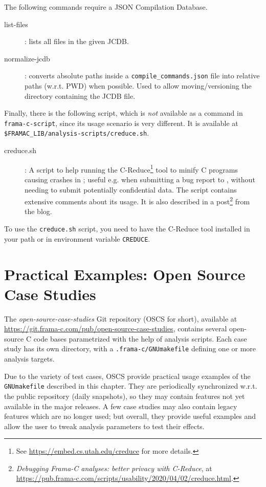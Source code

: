 The following commands require a JSON Compilation Database.

\begin{description}
\item[list-files]: lists all files in the given JCDB.
\item[normalize-jcdb]: converts absolute paths inside a
  \texttt{compile\_commands.json} file into relative paths (w.r.t. PWD)
  when possible. Used to allow moving/versioning the directory containing
  the JCDB file.
\end{description}

Finally, there is the following script, which is {\em not} available as a
command in \texttt{frama-c-script}, since its usage scenario is very
different. It is available at\\
\texttt{\$FRAMAC\_LIB/analysis-scripts/creduce.sh}.

\begin{description}
\item[creduce.sh]: A script to help running the C-Reduce\footnote{%
  See \url{https://embed.cs.utah.edu/creduce} for more details.} tool to minify
  C programs causing crashes in \FramaC; useful e.g. when submitting a bug
  report to \FramaC, without needing to submit potentially confidential data.
  The script contains extensive comments about its usage. It is also
  described in a post\footnote{%
    {\em Debugging Frama-C analyses: better privacy with C-Reduce},
    at \url{https://pub.frama-c.com/scripts/usability/2020/04/02/creduce.html}.}
  from the \FramaC blog.
\end{description}

To use the \texttt{creduce.sh} script, you need to have the C-Reduce tool
installed in your path or in environment variable \texttt{CREDUCE}.

\section{Practical Examples: Open Source Case Studies}

The {\em open-source-case-studies} Git repository (OSCS for short),
available at \url{https://git.frama-c.com/pub/open-source-case-studies},
contains several open-source C code bases parametrized with the help of
analysis scripts. Each case study has its own directory, with a
\texttt{.frama-c/GNUmakefile} defining one or more analysis targets.

Due to the variety of test cases, OSCS provide practical usage
examples of the \texttt{GNUmakefile} described in this chapter.
They are periodically synchronized w.r.t. the public \FramaC repository
(daily snapshots), so they may contain features not yet available in the
major \FramaC releases. A few case studies may also contain legacy features
which are no longer used; but overall, they provide useful examples and allow
the user to tweak analysis parameters to test their effects.

